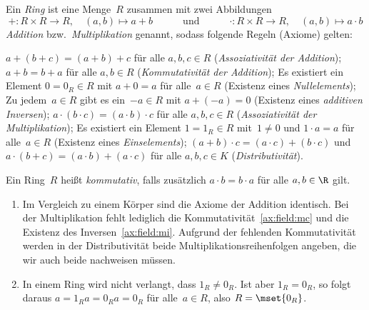 \documentclass[a4paper]{article}
\begin{document}
\begin{definition}[Ring]
    Ein \emph{Ring} ist eine Menge~$R$ zusammen mit zwei Abbildungen
    \begin{equation*}
        +\colon R \times R \to R,\quad (a, b) \mapsto a+b \quad\qquad\text{und}\qquad\quad \cdot\colon R \times R \to R,\quad (a, b) \mapsto a \cdot b
    \end{equation*}
    \emph{Addition} bzw.\ \emph{Multiplikation} genannt, sodass folgende Regeln (Axiome) gelten:
    \begin{enumerate}[leftmargin=*, widest=(A1)]
         $a+(b+c) = (a+b)+c$ für alle $a, b, c \in R$ (\emph{Assoziativität der Addition});\label{ax:ring:aa}
         $a+b = b+a$ für alle $a, b \in R$ (\emph{Kommutativität der Addition});\label{ax:ring:ac}
         Es existiert ein Element $0 = 0_R \in R$ mit $a+0 = a$ für alle~$a \in R$ (Existenz eines \emph{Nullelements});\label{ax:ring:an}
         Zu jedem~$a \in R$ gibt es ein~$-a \in R$ mit $a+(-a) = 0$ (Existenz eines \emph{additiven Inversen});\label{ax:ring:ai}
         $a\cdot(b\cdot c) = (a\cdot b)\cdot c$ für alle $a, b, c \in R$ (\emph{Assoziativität der Multiplikation});\label{ax:ring:ma}
         Es existiert ein Element $1 = 1_R \in R$ mit~$1 \neq 0$ und $1\cdot a = a$ für alle~$a \in R$ (Existenz eines \emph{Einselements});\label{ax:ring:mn}
         $(a+b)\cdot c = (a\cdot c)+(b\cdot c)$ und $a\cdot(b+c) = (a\cdot b)+(a\cdot c)$ für alle $a, b, c \in K$ (\emph{Distributivität}).\label{ax:ring:d}
    \end{enumerate}
\end{definition}

\begin{definition}
    Ein Ring~$R$ heißt \emph{kommutativ}, falls zusätzlich $a\cdot b = b\cdot a$ für alle $a, b \in \R$ gilt.
\end{definition}

\begin{remark}\leavevmode
    \begin{enumerate}
        \item Im Vergleich zu einem Körper sind die Axiome der Addition identisch. Bei der Multiplikation fehlt lediglich die Kommutativität~\ref{ax:field:mc} und die Existenz des Inversen~\ref{ax:field:mi}. Aufgrund der fehlenden Kommutativität werden in der Distributivität beide Multiplikationsreihenfolgen angeben, die wir auch beide nachweisen müssen.
        \item In einem Ring wird nicht verlangt, dass $1_R \neq 0_R$. Ist aber $1_R = 0_R$, so folgt daraus $a = 1_R a = 0_R a = 0_R$ für alle~$a \in R$, also $R = \mset{0_R}$.
    \end{enumerate}
\end{remark}
\end{document}
